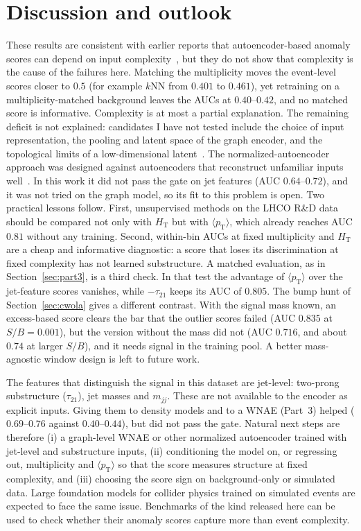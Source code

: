 \documentclass[11pt,a4paper]{article}
\newcommand{\pt}{\ensuremath{p_\mathrm{T}}\xspace}
\newcommand{\HT}{\ensuremath{H_\mathrm{T}}\xspace}
\newcommand{\mjj}{\ensuremath{m_{jj}}\xspace}
\newcommand{\tauTO}{\ensuremath{\tau_{21}}\xspace}
\newcommand{\ptmean}{\ensuremath{\langle \pt \rangle}\xspace}
\begin{document}
\section{Discussion and outlook}
\label{sec:discussion}

These results are consistent with earlier reports that autoencoder-based anomaly scores can
depend on input complexity~\cite{Finke:2021sdf}, but they do not show that complexity is the cause of the
failures here. Matching the multiplicity moves the event-level scores closer to $0.5$
(for example $k$NN from $0.401$ to $0.461$), yet retraining on a multiplicity-matched background
leaves the AUCs at $0.40$--$0.42$, and no matched score is informative. Complexity is at most a
partial explanation. The remaining deficit is not explained: candidates I have not tested include the
choice of input representation, the pooling and latent space of the graph encoder, and the
topological limits of a low-dimensional latent~\cite{Batson:2021agz}. The
normalized-autoencoder approach was designed against autoencoders that reconstruct unfamiliar inputs
well~\cite{Yoon:2021nae,Dillon:2022mkq,CMS:2025lmn}. In this work it did not pass the gate on jet
features (AUC $0.64$--$0.72$), and it was not tried on the graph model, so its fit to this problem
is open. Two practical lessons follow. First, unsupervised methods on the LHCO R\&D data
should be compared not only with \HT but with \ptmean, which already reaches AUC $0.81$ without
any training. Second, within-bin AUCs at fixed multiplicity and \HT are a cheap and informative
diagnostic: a score that loses its discrimination at fixed complexity has not learned
substructure. A matched evaluation, as in Section~\ref{sec:part3}, is a third check. In that test the
advantage of \ptmean over the jet-feature scores vanishes, while $-\tauTO$ keeps its AUC of $0.805$.
The bump hunt of Section~\ref{sec:cwola} gives a different contrast. With the signal mass known, an
excess-based score clears the bar that the outlier scores failed (AUC $0.835$ at $S/B=0.001$), but the
version without the mass did not (AUC $0.716$, and about $0.74$ at larger $S/B$), and it needs signal in the training pool. A
better mass-agnostic window design is left to future work.

The features that distinguish the signal in this dataset are jet-level: two-prong
substructure (\tauTO), jet masses and \mjj. These are not available to the encoder as explicit
inputs. Giving them to density models and to a WNAE (Part~3) helped
($0.69$--$0.76$ against $0.40$--$0.44$), but did not pass the gate. Natural next steps are therefore (i) a graph-level
WNAE or other normalized autoencoder trained with jet-level and substructure inputs,
(ii) conditioning the model on, or regressing out, multiplicity and \ptmean so that the score
measures structure at fixed complexity, and (iii) choosing the score sign on background-only or
simulated data. Large foundation models for collider physics trained on simulated events are
expected to face the same issue. Benchmarks of the kind released here can be used to check
whether their anomaly scores capture more than event complexity.
\end{document}
